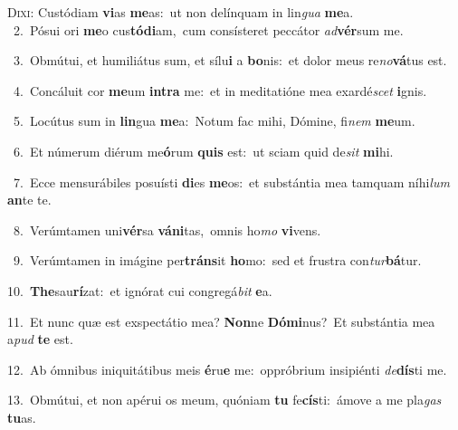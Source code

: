\lettrine{\initial\textcolor{\initialcolor}{D}}{ixi:} Custódiam \textbf{vi}\-as \textbf{me}\-as:~\star ut non delínquam in lin\textit{gua} \textbf{me}\-a.\\
{\numbfont\textcolor{\numbcolor}{~2.}}~Pósui ori \textbf{me}\-o cus\-\textbf{tó}\-\textbf{di}am,~\star cum consísteret peccátor \textit{ad}\-\textbf{vér}sum me.\par
{\numbfont\textcolor{\numbcolor}{~3.}}~Obmútui, et humiliátus sum, et sílu\textbf{i} a \textbf{bo}\-nis:~\star et dolor meus re\-\textit{no}\-\textbf{vá}tus est.\par
{\numbfont\textcolor{\numbcolor}{~4.}}~Concáluit cor \textbf{me}\-um \textbf{in}\-\textbf{tra} me:~\star et in meditatióne mea exardé\textit{scet} \textbf{i}\-gnis.\par
{\numbfont\textcolor{\numbcolor}{~5.}}~Locútus sum in \textbf{lin}\-gua \textbf{me}\-a:~\star Notum fac mihi, Dómine, fi\textit{nem} \textbf{me}\-um.\par
{\numbfont\textcolor{\numbcolor}{~6.}}~Et númerum diérum me\-\textbf{ó}\-rum \textbf{quis} est:~\star ut sciam quid de\textit{sit} \textbf{mi}\-hi.\par
{\numbfont\textcolor{\numbcolor}{~7.}}~Ecce mensurábiles posuísti \textbf{di}\-es \textbf{me}\-os:~\star et substántia mea tamquam níhi\textit{lum} \textbf{an}\-te te.\par
{\numbfont\textcolor{\numbcolor}{~8.}}~Verúmtamen uni\-\textbf{vér}\-sa \textbf{vá}\-\textbf{ni}tas,~\star omnis ho\textit{mo} \textbf{vi}\-vens.\par
{\numbfont\textcolor{\numbcolor}{~9.}}~Verúmtamen in imágine per\-\textbf{tráns}\-it \textbf{ho}\-mo:~\star sed et frustra con\-\textit{tur}\-\textbf{bá}tur.\par
{\numbfont\textcolor{\numbcolor}{10.}}~\-\textbf{The}\-sau\-\textbf{rí}\-zat:~\star et ignórat cui congregá\textit{bit} \textbf{e}\-a.\par
{\numbfont\textcolor{\numbcolor}{11.}}~Et nunc quæ est exspectátio mea? \textbf{Non}\-ne \textbf{Dó}\-\textbf{mi}nus?~\star Et substántia mea a\textit{pud} \textbf{te} est.\par
{\numbfont\textcolor{\numbcolor}{12.}}~Ab ómnibus iniquitátibus meis \textbf{é}\-ru\textbf{e} me:~\star oppróbrium insipiénti \textit{de}\-\textbf{dís}ti me.\par
{\numbfont\textcolor{\numbcolor}{13.}}~Obmútui, et non apérui os meum, quóniam \textbf{tu} fe\-\textbf{cís}\-ti:~\star ámove a me pla\textit{gas} \textbf{tu}\-as.\par
